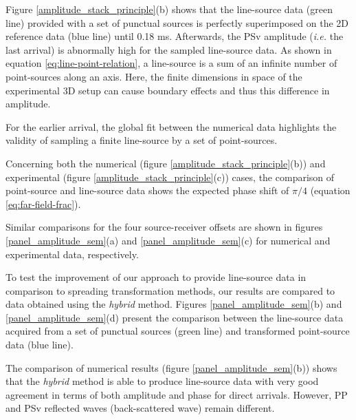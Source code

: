 \documentclass[paper,extra]{gji} %
\begin{document}
\noindent Figure \ref{amplitude_stack_principle}(b) shows that the line-source data (green line) provided with a set of punctual sources is perfectly superimposed on the 2D reference data (blue line) until 0.18 ms. Afterwards, the PSv amplitude (\textit{i.e.} the last arrival) is abnormally high for the sampled line-source data. As shown in equation \ref{eq:line-point-relation}, a line-source is a sum of an infinite number of point-sources along an axis. Here, the finite dimensions in space of the experimental 3D setup can cause boundary effects and thus this difference in amplitude.

\noindent For the earlier arrival, the global fit between the numerical data highlights the validity of sampling a finite line-source by a set of point-sources.

\noindent Concerning both the numerical (figure \ref{amplitude_stack_principle}(b)) and experimental (figure \ref{amplitude_stack_principle}(c)) cases, the comparison of point-source and line-source data shows the expected phase shift of $\pi/4$ (equation \ref{eq:far-field-frac}).

\noindent Similar comparisons for the four source-receiver offsets are shown in figures \ref{panel_amplitude_sem}(a) and \ref{panel_amplitude_sem}(c) for numerical and experimental data, respectively.

\noindent To test the improvement of our approach to provide line-source data in comparison to spreading transformation methods, our results are compared to data obtained using the \textit{hybrid} method. Figures \ref{panel_amplitude_sem}(b) and \ref{panel_amplitude_sem}(d) present the comparison between the line-source data acquired from a set of punctual sources (green line) and transformed point-source data (blue line).

\noindent The comparison of numerical results (figure \ref{panel_amplitude_sem}(b)) shows that the \textit{hybrid} method is able to produce line-source data with very good agreement in terms of both amplitude and phase for direct arrivals. However, PP and PSv reflected waves (back-scattered wave) remain different.
\end{document}

